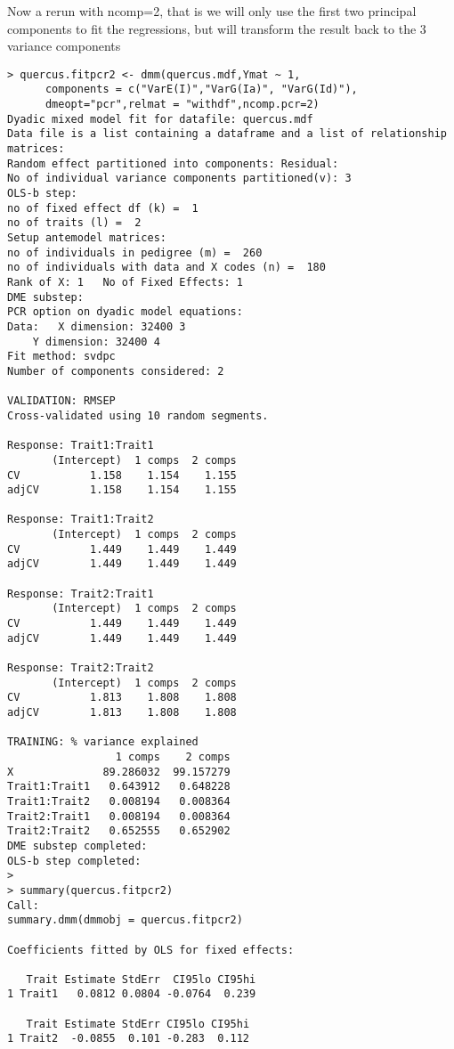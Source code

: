 \documentclass[titlepage]{article}  %
\begin{document}
Now a rerun with ncomp=2, that is we will only use the first two principal components to fit the regressions, but will transform the result back to the 3 variance components

\begin{verbatim}
> quercus.fitpcr2 <- dmm(quercus.mdf,Ymat ~ 1,
      components = c("VarE(I)","VarG(Ia)", "VarG(Id)"),
      dmeopt="pcr",relmat = "withdf",ncomp.pcr=2)
Dyadic mixed model fit for datafile: quercus.mdf  
Data file is a list containing a dataframe and a list of relationship matrices:
Random effect partitioned into components: Residual:
No of individual variance components partitioned(v): 3 
OLS-b step:
no of fixed effect df (k) =  1 
no of traits (l) =  2 
Setup antemodel matrices:
no of individuals in pedigree (m) =  260 
no of individuals with data and X codes (n) =  180 
Rank of X: 1   No of Fixed Effects: 1 
DME substep:
PCR option on dyadic model equations:
Data: 	X dimension: 32400 3 
	Y dimension: 32400 4
Fit method: svdpc
Number of components considered: 2

VALIDATION: RMSEP
Cross-validated using 10 random segments.

Response: Trait1:Trait1 
       (Intercept)  1 comps  2 comps
CV           1.158    1.154    1.155
adjCV        1.158    1.154    1.155

Response: Trait1:Trait2 
       (Intercept)  1 comps  2 comps
CV           1.449    1.449    1.449
adjCV        1.449    1.449    1.449

Response: Trait2:Trait1 
       (Intercept)  1 comps  2 comps
CV           1.449    1.449    1.449
adjCV        1.449    1.449    1.449

Response: Trait2:Trait2 
       (Intercept)  1 comps  2 comps
CV           1.813    1.808    1.808
adjCV        1.813    1.808    1.808

TRAINING: % variance explained
                 1 comps    2 comps
X              89.286032  99.157279
Trait1:Trait1   0.643912   0.648228
Trait1:Trait2   0.008194   0.008364
Trait2:Trait1   0.008194   0.008364
Trait2:Trait2   0.652555   0.652902
DME substep completed:
OLS-b step completed:
>
> summary(quercus.fitpcr2)
Call:
summary.dmm(dmmobj = quercus.fitpcr2)

Coefficients fitted by OLS for fixed effects:

   Trait Estimate StdErr  CI95lo CI95hi
1 Trait1   0.0812 0.0804 -0.0764  0.239

   Trait Estimate StdErr CI95lo CI95hi
1 Trait2  -0.0855  0.101 -0.283  0.112



\end{verbatim}
\end{document}
